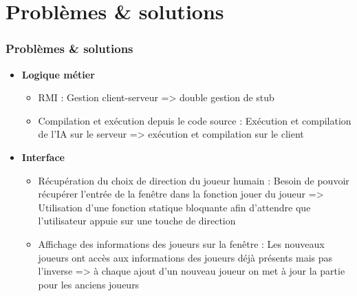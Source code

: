 \section{Problèmes \& solutions}

    \begin{frame}
        \frametitle{Problèmes \& solutions}

        \begin{itemize}
		 \item \textbf{Logique métier}
		 	\begin{itemize}
		 		\item RMI : Gestion client-serveur => double gestion de stub
		 		\item Compilation et exécution depuis le code source : Exécution et compilation de l'IA sur le serveur => exécution et compilation sur le client
		 	\end{itemize}
		\item \textbf{Interface}
			\begin{itemize}
				\item Récupération du choix de direction du joueur humain : Besoin de pouvoir récupérer l'entrée de la fenêtre dans la fonction jouer du joueur => Utilisation d'une fonction statique bloquante afin d'attendre que l'utilisateur appuie sur une touche de direction
				\item Affichage des informations des joueurs sur la fenêtre :  Les nouveaux joueurs ont accès aux informations des joueurs déjà présents mais pas l'inverse => à chaque ajout d'un nouveau joueur on met à jour la partie pour les anciens joueurs
			\end{itemize}
		\end{itemize}
    \end{frame}
